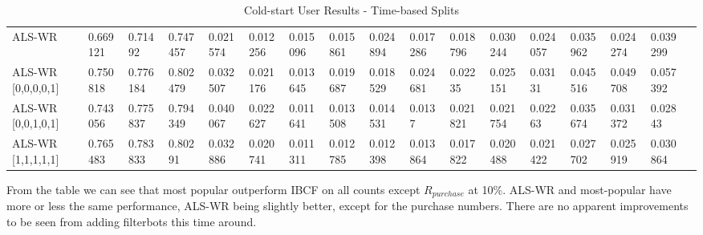 \begin{table}[H]
{\begin{tabular}{*{17}{l}}
\rowcolor{Gray}
ALS-WR 			   	& 0.669121&	0.71492	&	0.747457&	0.021574&	0.012256&	0.015096&	0.015861&	0.024894&	0.017286&	0.018796&	0.030244&	0.024057&	0.035962&	0.024274&	0.039299	&	\\
ALS-WR [0,0,0,0,1] 	&	0.750818	&	0.776184	&	0.802479	&	0.032507	&	0.021176	&	0.013645	&	0.019687	&	0.018529	&	0.024681	&	0.02235	&	0.025151	&	0.03131	&	0.045516	&	0.049708	&	0.057392	& \\
ALS-WR [0,0,1,0,1]  & 0.743056&	0.775837 &	0.794349 &	0.040067 &	0.022627&	0.011641&	0.013508&	0.014531&	0.0137 &	0.021821 &	0.021754 &	0.02263	&	0.035674 &	0.031372&	0.02843	& \\
ALS-WR [1,1,1,1,1] 	& 0.765483& 0.783833&	0.80291	&	0.032886&	0.020741&	0.011311&	0.012785&	0.012398&	0.013864&	0.017822&	0.020488&	0.021422&	0.027702&	0.025919&	0.030864	& \\

\bottomrule
\end{tabular}
}
\caption{Cold-start User Results -  Time-based Splits}
\end{table}

From the table we can see that most popular outperform IBCF on all counts except $R_{purchase}$ at 10\%. ALS-WR and most-popular have more or less
the same performance, ALS-WR being slightly better, except for the purchase numbers. There are no apparent improvements to be seen from adding filterbots
this time around.

